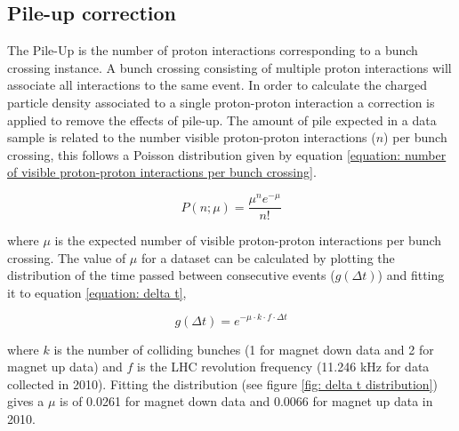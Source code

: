 \subsection{Pile-up correction}
\label{subsection: charged particle density, pile-up}

The Pile-Up is the number of proton interactions corresponding to a bunch crossing instance. A bunch crossing consisting of multiple proton interactions will associate all interactions to the same event. In order to calculate the charged particle density associated to a single proton-proton interaction a correction is applied to remove the effects of pile-up. The amount of pile expected in a data sample is related to the number visible proton-proton interactions ($n$) per bunch crossing, this follows a Poisson distribution given by equation \ref{equation: number of visible proton-proton interactions per bunch crossing}. 

\begin{equation}
	P(n; \mu) = \frac{\mu^n e^{-\mu}}{n!}
	\label{equation: number of visible proton-proton interactions per bunch crossing}
\end{equation}

where $\mu$ is the expected number of visible proton-proton interactions per bunch crossing. The value of $\mu$ for a dataset can be calculated by plotting the distribution of the time passed between consecutive events ($g(\Delta t)$) and fitting it to equation \ref{equation: delta t},

\begin{equation}
	g(\Delta t) = e^{-\mu\cdot k \cdot f \cdot \Delta t}
	\label{equation: delta t}
\end{equation}

where $k$ is the number of colliding bunches (1 for magnet down data and 2 for magnet up data) and $f$ is the LHC revolution frequency (11.246 kHz for data collected in 2010). Fitting the distribution (see figure \ref{fig: delta t distribution}) gives a $\mu$ is of 0.0261 for magnet down data and 0.0066 for magnet up data in 2010. %

